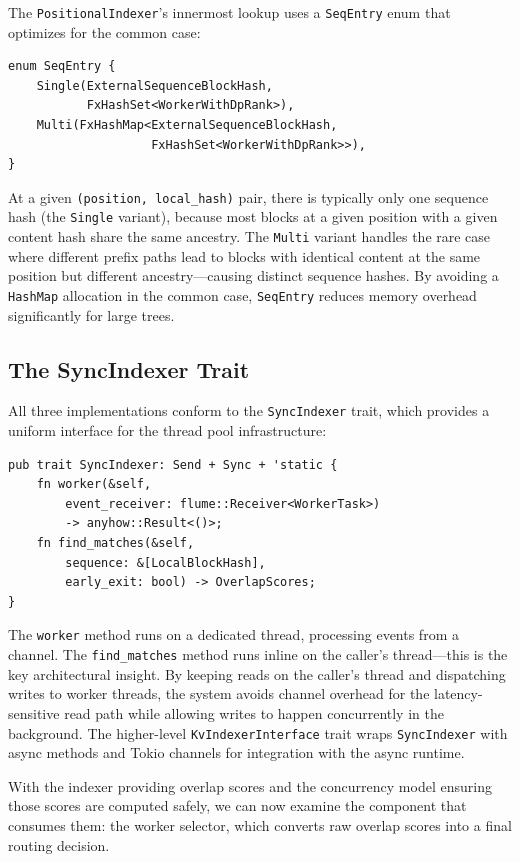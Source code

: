 The \texttt{PositionalIndexer}'s innermost lookup uses a \texttt{SeqEntry} enum that optimizes for the common case:

\begin{verbatim}
enum SeqEntry {
    Single(ExternalSequenceBlockHash,
           FxHashSet<WorkerWithDpRank>),
    Multi(FxHashMap<ExternalSequenceBlockHash,
                    FxHashSet<WorkerWithDpRank>>),
}
\end{verbatim}

At a given \texttt{(position, local\_hash)} pair, there is typically only one sequence hash (the \texttt{Single} variant), because most blocks at a given position with a given content hash share the same ancestry. The \texttt{Multi} variant handles the rare case where different prefix paths lead to blocks with identical content at the same position but different ancestry---causing distinct sequence hashes. By avoiding a \texttt{HashMap} allocation in the common case, \texttt{SeqEntry} reduces memory overhead significantly for large trees.

\subsection{The SyncIndexer Trait}

All three implementations conform to the \texttt{SyncIndexer} trait, which provides a uniform interface for the thread pool infrastructure:

\begin{verbatim}
pub trait SyncIndexer: Send + Sync + 'static {
    fn worker(&self,
        event_receiver: flume::Receiver<WorkerTask>)
        -> anyhow::Result<()>;
    fn find_matches(&self,
        sequence: &[LocalBlockHash],
        early_exit: bool) -> OverlapScores;
}
\end{verbatim}

The \texttt{worker} method runs on a dedicated thread, processing events from a channel. The \texttt{find\_matches} method runs inline on the caller's thread---this is the key architectural insight. By keeping reads on the caller's thread and dispatching writes to worker threads, the system avoids channel overhead for the latency-sensitive read path while allowing writes to happen concurrently in the background. The higher-level \texttt{KvIndexerInterface} trait wraps \texttt{SyncIndexer} with async methods and Tokio channels for integration with the async runtime.

With the indexer providing overlap scores and the concurrency model ensuring those scores are computed safely, we can now examine the component that consumes them: the worker selector, which converts raw overlap scores into a final routing decision.


